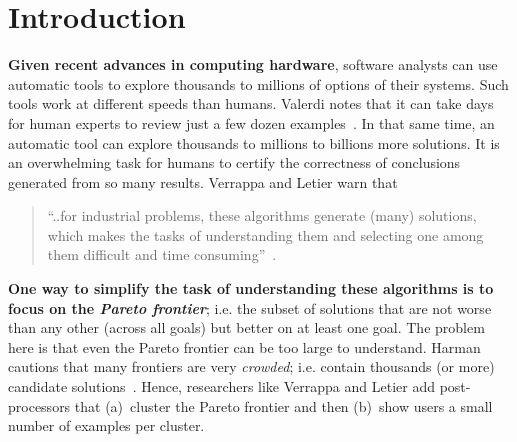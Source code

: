 \documentclass[10pt,journal,compsoc]{IEEEtran}
\newcommand{\fig}[1]{Figure~\ref{fig:#1}}
\newcommand{\ADD}[1]{\textcolor{MyDarkBlue}{{\bf #1}}}
\begin{document}
\section{Introduction}
\ADD{Given recent advances in computing hardware},  
software analysts can use automatic tools to
explore thousands to millions
of options of their systems. 
Such tools work at different speeds than humans.  Valerdi notes that it can take days for
human experts to review just a few dozen
examples~\cite{valerdi11}.  In that same time, an
automatic tool can explore thousands to millions to
billions more solutions.  
It is an overwhelming task for humans to
certify the correctness of conclusions generated
from so many results. Verrappa and Letier warn that
\begin{quote}
``..for industrial problems, these algorithms generate
(many) solutions, which makes the tasks of
understanding them and selecting one among them
difficult and time consuming''~\cite{veer11}.
\end{quote}


\ADD{One way to simplify the task of understanding these
algorithms is to focus on the {\em Pareto frontier}}; i.e.
the subset of solutions 
that are not worse than any other (across all goals)
but better on at least one goal. 
The problem here is that even the Pareto frontier can be too large to understand.
Harman cautions that many frontiers are very {\em crowded}; i.e. contain thousands (or more)
candidate solutions~\cite{harm13}.
Hence, researchers like Verrappa and Letier add post-processors
that (a)~cluster the Pareto frontier and
then (b)~show users a small number of examples per cluster. 
\end{document}
